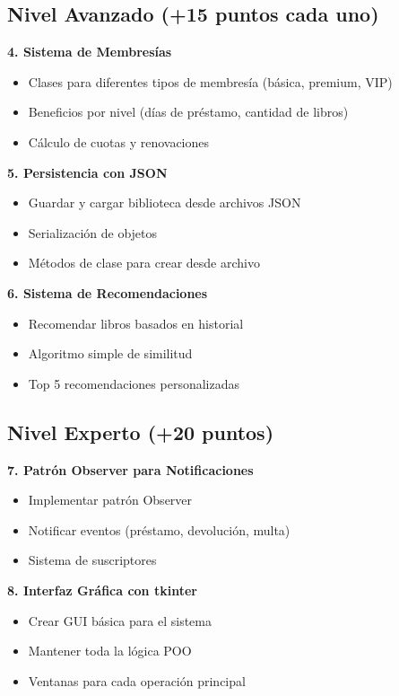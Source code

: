 \documentclass[11pt,letterpaper]{article}
\begin{document}
\subsection{Nivel Avanzado (+15 puntos cada uno)}

\textbf{4. Sistema de Membresías}
\begin{itemize}
    \item Clases para diferentes tipos de membresía (básica, premium, VIP)
    \item Beneficios por nivel (días de préstamo, cantidad de libros)
    \item Cálculo de cuotas y renovaciones
\end{itemize}

\textbf{5. Persistencia con JSON}
\begin{itemize}
    \item Guardar y cargar biblioteca desde archivos JSON
    \item Serialización de objetos
    \item Métodos de clase para crear desde archivo
\end{itemize}

\textbf{6. Sistema de Recomendaciones}
\begin{itemize}
    \item Recomendar libros basados en historial
    \item Algoritmo simple de similitud
    \item Top 5 recomendaciones personalizadas
\end{itemize}

\subsection{Nivel Experto (+20 puntos)}

\textbf{7. Patrón Observer para Notificaciones}
\begin{itemize}
    \item Implementar patrón Observer
    \item Notificar eventos (préstamo, devolución, multa)
    \item Sistema de suscriptores
\end{itemize}

\textbf{8. Interfaz Gráfica con tkinter}
\begin{itemize}
    \item Crear GUI básica para el sistema
    \item Mantener toda la lógica POO
    \item Ventanas para cada operación principal
\end{itemize}
\end{document}

